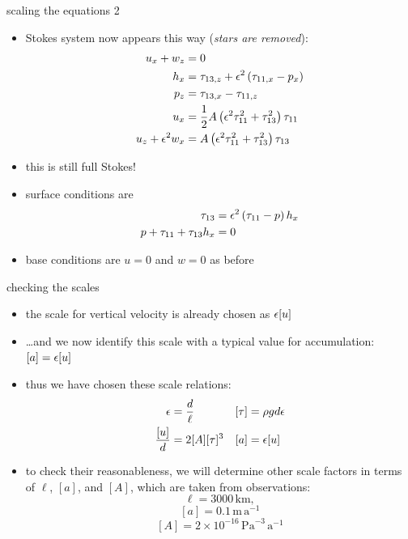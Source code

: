 \begin{frame}{scaling the equations 2}

\begin{itemize}
\item Stokes system now appears this way (\emph{stars are removed}):
\begin{align*}
u_x + w_z &= 0 \\
h_x &= \tau_{13,z} + \epsilon^2 \left(\tau_{11,x} - p_x\right) \\
p_z &= \tau_{13,x} - \tau_{11,z} \\
u_x &= \frac{1}{2} A \left(\epsilon^2 \tau_{11}^2 + \tau_{13}^2\right) \tau_{11} \\
u_z + \epsilon^2 w _x &= A \left(\epsilon^2 \tau_{11}^2 + \tau_{13}^2\right) \tau_{13}
\end{align*}
\item this is still full Stokes!
\item surface conditions are
\begin{align*}
\tau_{13} &= \epsilon^2 \left(\tau_{11} - p\right) h_x \\
p + \tau_{11} + \tau_{13} h_x &= 0
\end{align*}
\item base conditions are $u=0$ and $w=0$ as before
\end{itemize}
\end{frame}


\begin{frame}{checking the scales}

\begin{itemize}
\item the scale for vertical velocity is already chosen as $\epsilon [u]$
\item \dots and we now identify this scale with a typical value for accumulation: $[a] = \epsilon [u]$
\item thus we have chosen these scale relations:
  \begin{align*}
  \epsilon &= \frac{d}{\ell}           & [\tau] &= \rho g d \epsilon \\
  \frac{[u]}{d} &= 2 [A] [\tau]^3  &    [a] &= \epsilon [u]
  \end{align*}
\item to check their reasonableness, we will determine other scale factors in terms of $\ell$, $[a]$, and $[A]$, which are taken from observations:
  $$\ell = 3000\,\text{km},$$
  $$[a] = 0.1\,\text{m}\,\text{a}^{-1}$$
  $$[A] = 2 \times 10^{-16}\,\text{Pa}^{-3}\,\text{a}^{-1}$$
\end{itemize}
\end{frame}


